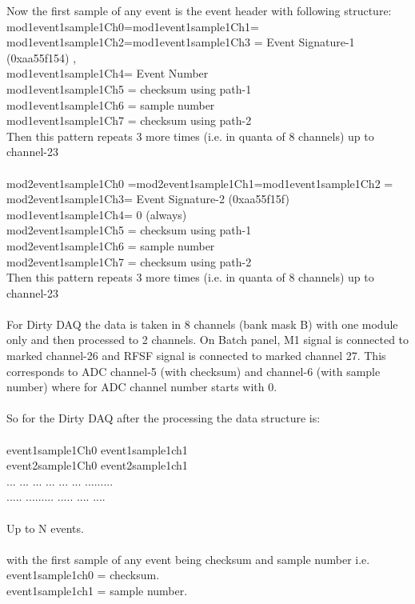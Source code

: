 \documentclass[12pt]{article}
\begin{document}
Now the first sample of any event is the event header with following structure:\\
mod1event1sample1Ch0=mod1event1sample1Ch1=\\
mod1event1sample1Ch2=mod1event1sample1Ch3 = Event Signature-1 (0xaa55f154) ,\\ mod1event1sample1Ch4= Event Number\\
mod1event1sample1Ch5 = checksum using path-1  \\mod1event1sample1Ch6 = sample number \\mod1event1sample1Ch7 = checksum using path-2 \\
Then this pattern repeats 3 more times (i.e. in quanta of 8 channels) up to channel-23\\
\\
mod2event1sample1Ch0 =mod2event1sample1Ch1=mod1event1sample1Ch2 = mod2event1sample1Ch3= Event Signature-2 (0xaa55f15f) \\mod1event1sample1Ch4= 0 (always)\\
mod2event1sample1Ch5 = checksum using path-1 \\ mod2event1sample1Ch6 = sample number \\mod2event1sample1Ch7 = checksum using path-2 \\
Then this pattern repeats 3 more times (i.e. in quanta of 8 channels) up to channel-23\\
\\
For Dirty DAQ the data is taken in 8 channels (bank mask B) with one module only and then processed to 2 channels.
On Batch panel, M1 signal is connected to marked channel-26 and RFSF signal is connected to marked channel 27. This corresponds to 
ADC channel-5 (with checksum) and channel-6 (with sample number) where for ADC channel number starts with 0.\\
\\
So for the Dirty DAQ after the processing the data structure is:\\
\\
event1sample1Ch0   event1sample1ch1\\
event2sample1Ch0   event2sample1ch1\\
... ... ... ... ... ... .........\\
.....  .........  ..... .... ....\\
\\
Up to N events.\\
\\
with the first sample of any event being checksum and sample number i.e.\\
     event1sample1ch0 = checksum.\\
     event1sample1ch1 = sample number.\\
\end{document}
